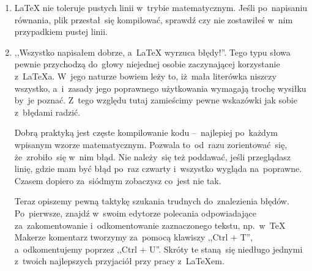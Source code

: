 \documentclass[a4paper,11pt]{article}
\newcommand{\tbs}{\textbackslash}  %
\begin{document}
\begin{enumerate}
  w~tekście, lecz polecenie zakończenia komendy. Skutkiem tego
  \begin{quote}
    \texttt{Używaj \tbs LaTeX a z~uwagą.}
  \end{quote}
  daje pożądany tekst
  \begin{quote}
    Używaj \LaTeX a z~uwagą.
  \end{quote}
  Jednak już
  \begin{quote}
    \texttt{\tbs LaTeX to~potężne narzędzie.}
  \end{quote}
  daje
  \begin{quote}
    \LaTeX to~potężne narzędzie.
  \end{quote}
  Aby uniknąć tego typu problemów należy komendy po~których ma~być
  odstęp kończyć \texttt{\{\}}. Przykładowo
  \begin{displayquote}
    \texttt{\tbs LaTeX\{\} to~potężne narzędzie.}
  \end{displayquote}
  wyświetli tekst
  \begin{displayquote}
    \LaTeX{} to~potężne narzędzie.
  \end{displayquote}
\item \LaTeX{} nie toleruje pustych linii w~trybie matematycznym.
  Jeśli po~napisaniu równania, plik przestał~się kompilować, sprawdź
  czy nie zostawiłeś w~nim przypadkiem pustej linii.
\item ,,Wszystko napisałem dobrze, a~\LaTeX{} wyrzuca błędy!''. Tego
  typu słowa pewnie przychodzą do~głowy niejednej osobie zaczynającej
  korzystanie z~\LaTeX a. W~jego naturze bowiem leży to, iż~mała
  literówka niszczy wszystko, a~i~zasady jego poprawnego użytkowania
  wymagają trochę wysiłku by~je poznać. Z~tego względu tutaj
  zamieścimy pewne wskazówki jak sobie z~błędami radzić.

  Dobrą praktyką jest częste kompilowanie kodu --~najlepiej po~każdym
  wpisanym wzorze matematycznym. Pozwala to~od~razu zorientować~się,
  że~zrobiło~się w~nim błąd. Nie należy~się też poddawać, jeśli
  przeglądasz linię, gdzie mam być błąd po~raz czwarty i~wszystko
  wygląda na~poprawne. Czasem dopiero za~siódmym zobaczysz co~jest nie
  tak.

  Teraz opiszemy pewną taktykę szukania trudnych do~znalezienia
  błędów. Po~pierwsze, znajdź w~swoim edytorze polecania odpowiadające
  za~zakomentowanie i~odkomentowanie zaznaczonego tekstu, np.~w~\TeX
  Makerze komentarz tworzymy za~pomocą klawiszy ,,Ctrl + T'',
  a~odkomentujemy poprzez ,,Ctrl + U''. Skróty te staną~się niedługo
  jednymi z~twoich najlepszych przyjaciół przy pracy z~\LaTeX em.


\end{enumerate}
\end{document}
